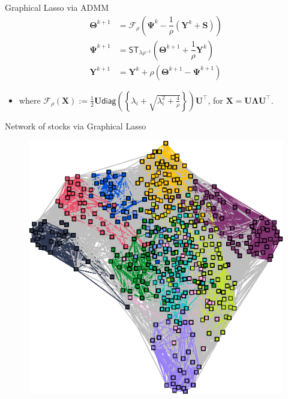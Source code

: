 \documentclass[aspectratio=169]{beamer}
\begin{document}
                \begin{frame}{Graphical Lasso via ADMM}
                  \begin{align*}
                    \boldsymbol \Theta^{k+1} & = \mathcal{F}_\rho\left(\boldsymbol \Psi^k - \dfrac{1}{\rho}\left(\bm Y^k + \bm S\right)\right) \\
                    \boldsymbol \Psi^{k+1} & = \textsf{ST}_{\lambda\rho^{-1}}\left(\boldsymbol \Theta^{k+1} + \dfrac{1}{\rho}\bm Y^{k}\right) \\
                    \bm Y^{k+1} & = \bm Y^k + \rho\left(\boldsymbol \Theta^{k+1} - \boldsymbol \Psi^{k+1}\right)
                  \end{align*}
                  \begin{itemize}
                    \item where $\mathcal{F}_{\rho}(\bm X) := \frac{1}{2} \bm U \textsf{diag}\left(\left\{\lambda_i + \sqrt{\lambda^2_i + \frac{4}{\rho}}\right\}\right)\bm U^\top$, for $\bm X = \bm U \boldsymbol \Lambda \bm U^\top$.
                  \end{itemize}
                \end{frame}

                \begin{frame}{Network of stocks via Graphical Lasso}
                  \begin{figure}[!htb]
                    \centering
                    \includegraphics[scale=0.5]{images/stock-network-glasso.eps}
                  \end{figure}
                \end{frame}
\end{document}
